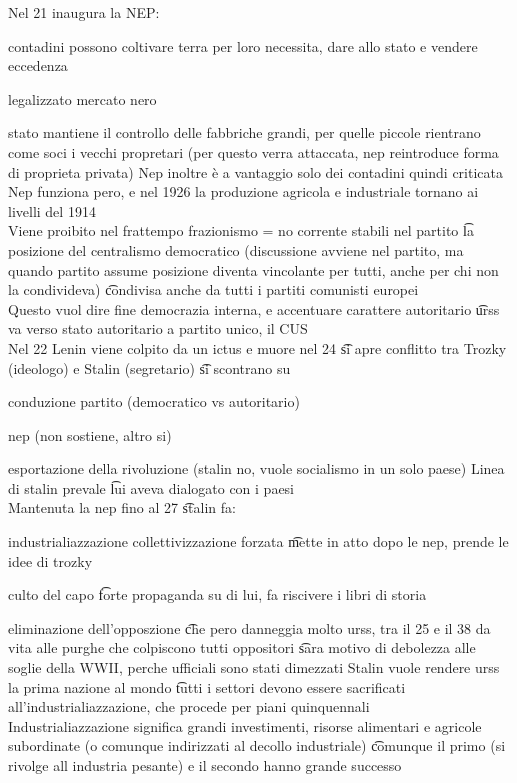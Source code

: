 \documentclass[12pt]{article}
\begin{document}
\ei
Nel 21 inaugura la NEP:
\bi
  \item contadini possono coltivare terra per loro necessita, dare allo stato e vendere eccedenza
  \item legalizzato mercato nero
  \item stato mantiene il controllo delle fabbriche grandi, per quelle piccole rientrano come soci i vecchi propretari (per questo verra attaccata, nep reintroduce forma di proprieta privata)
\ei
Nep inoltre è a vantaggio solo dei contadini quindi criticata \\
Nep funziona pero, e nel 1926 la produzione agricola e industriale tornano ai livelli del 1914 \\
Viene proibito nel frattempo frazionismo = no corrente stabili nel partito \t la posizione del centralismo democratico (discussione avviene nel partito, ma quando partito assume posizione diventa vincolante per tutti, anche per chi non la condivideva) \t condivisa anche da tutti i partiti comunisti europei \\
Questo vuol dire fine democrazia interna, e accentuare carattere autoritario \t urss va verso stato autoritario a partito unico, il CUS \\
Nel 22 Lenin viene colpito da un ictus e muore nel 24 \t si apre conflitto tra Trozky (ideologo) e Stalin (segretario) \t si scontrano su
\bi
  \item conduzione partito (democratico vs autoritario)
  \item nep (non sostiene, altro si)
  \item esportazione della rivoluzione (stalin no, vuole socialismo in un solo paese)
\ei
Linea di stalin prevale \t lui aveva dialogato con i paesi \\
Mantenuta la nep fino al 27 \t stalin fa:
\bi
  \item industrialiazzazione collettivizzazione forzata \t mette in atto dopo le nep, prende le idee di trozky
  \item culto del capo \t forte propaganda su di lui, fa riscivere i libri di storia
  \item eliminazione dell'opposzione \t che pero danneggia molto urss, tra il 25 e il 38 da vita alle purghe che colpiscono tutti oppositori \t sara motivo di debolezza alle soglie della WWII, perche ufficiali sono stati dimezzati
\ei
Stalin vuole rendere urss la prima nazione al mondo \t tutti i settori devono essere sacrificati all'industrialiazzazione, che procede per piani quinquennali \\
Industrialiazzazione significa grandi investimenti, risorse alimentari e agricole subordinate (o comunque indirizzati al decollo industriale) \t comunque il primo (si rivolge all industria pesante) e il secondo hanno grande successo \\
\end{document}
